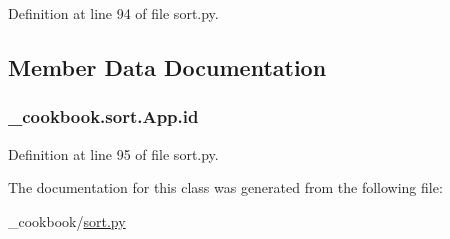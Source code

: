 Definition at line 94 of file sort.\-py.



\subsection{Member Data Documentation}
\hypertarget{class__cookbook_1_1sort_1_1App_a74df76f89c114157d3d2c375618fa124}{
\subsubsection[{id}]{\setlength{\rightskip}{0pt plus 5cm}\-\_\-cookbook.\-sort.\-App.\-id}}\label{class__cookbook_1_1sort_1_1App_a74df76f89c114157d3d2c375618fa124}


Definition at line 95 of file sort.\-py.



The documentation for this class was generated from the following file\-:\begin{DoxyCompactItemize}
\item 
\-\_\-cookbook/\hyperlink{sort_8py}{sort.\-py}\end{DoxyCompactItemize}
